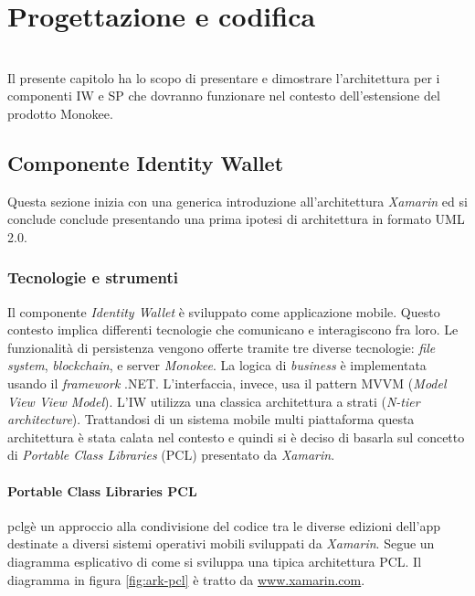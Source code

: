 
\chapter{Progettazione e codifica}
\label{cap:progettazione-codifica}

\\
Il presente capitolo ha lo scopo di presentare e dimostrare l'architettura per i componenti IW e SP che dovranno funzionare nel contesto dell'estensione del prodotto Monokee.
\section{Componente Identity Wallet}
Questa sezione inizia con una generica introduzione all’architettura \emph{Xamarin} ed si conclude conclude presentando una prima ipotesi di architettura in formato UML 2.0.
\subsection{Tecnologie e strumenti}
\label{sec:tecnologie-strumenti}
Il componente \emph{Identity Wallet} è sviluppato come applicazione mobile. Questo contesto implica differenti tecnologie che comunicano e interagiscono fra loro. Le funzionalità di persistenza vengono offerte tramite tre diverse tecnologie: \emph{file system}, \emph{blockchain}, e server \emph{Monokee}. La logica di \emph{business} è implementata usando il \emph{framework} .NET. L’interfaccia, invece, usa il pattern MVVM (\emph{Model View View Model}).
L’IW utilizza una classica architettura a strati (\emph{N-tier architecture}). Trattandosi di un sistema mobile multi piattaforma questa architettura è stata calata nel contesto e quindi si è deciso di basarla sul concetto di \emph{Portable Class Libraries} (PCL) presentato da \emph{Xamarin}. 

\subsubsection{Portable Class Libraries PCL}
\gls{pclg}\glsfirstoccur è un approccio alla condivisione del codice tra le diverse edizioni dell’app destinate a diversi sistemi operativi mobili sviluppati da \emph{Xamarin}. Segue un diagramma esplicativo di come si sviluppa una tipica architettura PCL. Il diagramma in figura \ref{fig:ark-pcl} è tratto da \url{www.xamarin.com}.

